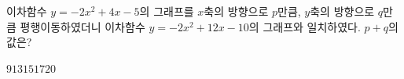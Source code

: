 이차함수 $y=-2x^2+4x-5$의 그래프를 $x$축의 방향으로 $p$만큼, $y$축의 방향으로 $q$만큼 평행이동하였더니 이차함수 $y=-2x^2+12x-10$의 그래프와 일치하였다. $p+q$의 값은?
\begin{choices32}{$9$}{$13$}{$15$}{$17$}{$20$}\end{choices32}
